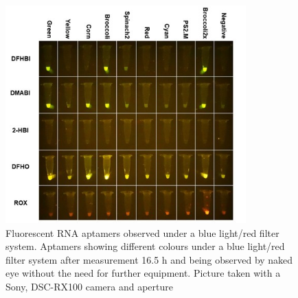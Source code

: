 \begin{figure} [ht] 
\begin{center}
\includegraphics[width=350px]{chapter2/chapter/figs/Imagen4.jpg}
\end{center}
\caption{Fluorescent RNA aptamers observed under a blue  light/red  filter  system. Aptamers  showing  different  colours  under  a  blue  light/red  filter  system  after measurement 16.5 h and being observed by naked eye without the need for further equipment. Picture taken with a Sony, DSC-RX100 camera and aperture}
\label{fig34}%
\end{figure}

